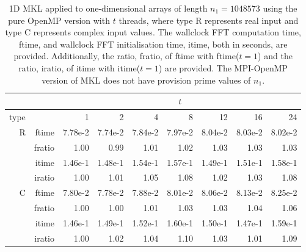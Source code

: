 \documentclass[a4]{article}
\begin{document}
\begin{table}
\begin{center}
\begin{tabular}{|r|r|r|r|r|r|r|r|r|}
\hline 
     &  & \multicolumn{7}{c|}{$t$} \\ \hline
    type  &  & 1           & 2    & 4    & 8    & 12   & 16    & 24  \\ \hline\hline
    R  & ftime &  7.78e-2 &   7.74e-2 &   7.84e-2 &   7.97e-2 &   8.04e-2 &   8.03e-2 &   8.02e-2    \\ 
      & fratio &  1.00 &   0.99 &   1.01 &   1.02 &   1.03 &   1.03 &   1.03    \\ 
     & itime &    1.46e-1 &   1.48e-1 &   1.54e-1 &   1.57e-1 &   1.49e-1 &   1.51e-1 &   1.58e-1     \\ 
     & iratio &   1.00 &   1.01 &   1.05 &   1.08 &   1.02 &   1.03 &   1.08    \\ \hline
    C  & ftime &   7.80e-2 &   7.78e-2 &   7.88e-2 &   8.01e-2 &   8.06e-2 &   8.13e-2 &   8.25e-2   \\ 
      & fratio &  1.00 &   1.00 &   1.01 &   1.03 &   1.03 &   1.04 &   1.06   \\ 
     & itime &    1.46e-1 &   1.49e-1 &   1.52e-1 &   1.60e-1 &   1.50e-1 &   1.47e-1 &   1.59e-1      \\ 
     & iratio &   1.00 &   1.02 &   1.04 &   1.10 &   1.03 &   1.01 &   1.09   \\ \hline
\end{tabular}
\caption{1D MKL applied to one-dimensional arrays of length $n_1=1048573$ using the pure OpenMP version with $t$ threads, where type R represents real input and type C represents complex input values. The wallclock FFT computation time, ftime, and wallclock FFT initialisation time, itime, both in seconds, are provided. Additionally, the ratio, fratio, of ftime  with ftime($t=1$) and the ratio, iratio, of itime  with itime($t=1$) are provided. The MPI-OpenMP version of MKL does not have provision prime values of $n_1.$   }\label{Tbl:MKL1d1048573}
\end{center}
\end{table}
\end{document}

